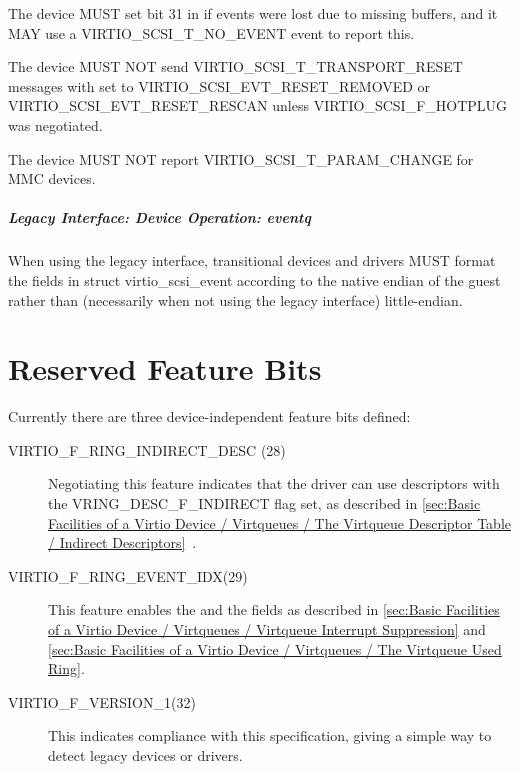 The device MUST set bit 31 in  if events were lost due to
missing buffers, and it MAY use a VIRTIO_SCSI_T_NO_EVENT event to report
this.

The device MUST NOT send VIRTIO_SCSI_T_TRANSPORT_RESET messages
with  set to VIRTIO_SCSI_EVT_RESET_REMOVED or
VIRTIO_SCSI_EVT_RESET_RESCAN unless VIRTIO_SCSI_F_HOTPLUG was negotiated.

The device MUST NOT report VIRTIO_SCSI_T_PARAM_CHANGE for MMC devices.

\paragraph{Legacy Interface: Device Operation: eventq}\label{sec:Device Types / SCSI Host Device / Device Operation / Device Operation: eventq / Legacy Interface: Device Operation: eventq}
When using the legacy interface, transitional devices and drivers
MUST format the fields in struct virtio_scsi_event
according to the native endian of the guest rather than
(necessarily when not using the legacy interface) little-endian.

\chapter{Reserved Feature Bits}\label{sec:Reserved Feature Bits}

Currently there are three device-independent feature bits defined:

\begin{description}
  \item[VIRTIO_F_RING_INDIRECT_DESC (28)] Negotiating this feature indicates
  that the driver can use descriptors with the VRING_DESC_F_INDIRECT
  flag set, as described in \ref{sec:Basic Facilities of a Virtio Device / Virtqueues / The Virtqueue Descriptor Table / Indirect Descriptors}~.

  \item[VIRTIO_F_RING_EVENT_IDX(29)] This feature enables the 
  and the  fields as described in \ref{sec:Basic Facilities of a Virtio Device / Virtqueues / Virtqueue Interrupt Suppression} and \ref{sec:Basic Facilities of a Virtio Device / Virtqueues / The Virtqueue Used Ring}.

  \item[VIRTIO_F_VERSION_1(32)] This indicates compliance with this
    specification, giving a simple way to detect legacy devices or drivers.
\end{description}

